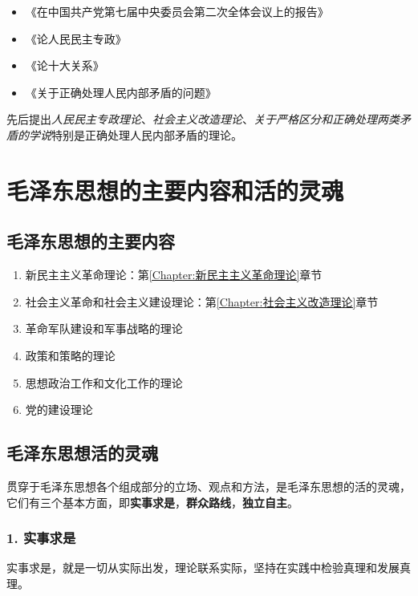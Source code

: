 \begin{enumerate}
        \begin{itemize}
            \item 《在中国共产党第七届中央委员会第二次全体会议上的报告》
            \item 《论人民民主专政》
            \item 《论十大关系》
            \item 《关于正确处理人民内部矛盾的问题》
        \end{itemize}
        先后提出\emph{人民民主专政理论}、\emph{社会主义改造理论}、\emph{关于严格区分和正确处理两类矛盾的学说}特别是正确处理人民内部矛盾的理论。
    \end{enumerate}


\section{毛泽东思想的主要内容和活的灵魂}

    \subsection{毛泽东思想的主要内容}
    \begin{enumerate}
        \item 新民主主义革命理论：第\ref{Chapter:新民主主义革命理论}章节
        \item 社会主义革命和社会主义建设理论：第\ref{Chapter:社会主义改造理论}章节
        \item 革命军队建设和军事战略的理论
        \item 政策和策略的理论
        \item 思想政治工作和文化工作的理论
        \item 党的建设理论
    \end{enumerate}

    \subsection{毛泽东思想活的灵魂}
    \par 贯穿于毛泽东思想各个组成部分的立场、观点和方法，是毛泽东思想的活的灵魂，它们有三个基本方面，即\textbf{实事求是}，\textbf{群众路线}，\textbf{独立自主}。

    \subsubsection{1. 实事求是} 实事求是，就是一切从实际出发，理论联系实际，坚持在实践中检验真理和发展真理。

